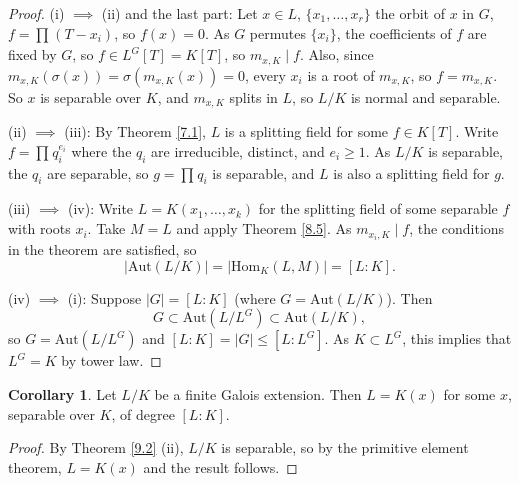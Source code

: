 \documentclass{article}
\theoremstyle{definition}
\newtheorem{cor}[theorem]{Corollary}
\begin{document}
\begin{proof}
    (i) $\implies $ (ii) and the last part: Let $x \in L$, $\{x_1,\ldots,x_r\}$ the orbit of $x$ in $G$, $f = \prod_{}^{} (T-x_i)$, so $f(x)=0$. As $G$ permutes $\{x_i\}$, the coefficients of $f$ are fixed by $G$, so $f \in L^G[T] = K[T]$, so $m_{x,K} \mid f$. Also, since $m_{x,K}(\sigma(x)) = \sigma(m_{x,K}(x))=0$, every $x_i$ is a root of $m_{x,K}$, so $f = m_{x,K}$. So $x$ is separable over $K$, and $m_{x,K}$ splits in $L$, so $L/K$ is normal and separable.
    \vspace{1mm}

    (ii) $\implies$ (iii): By Theorem \ref{7.1}, $L$ is a splitting field for some $f \in K[T]$. Write $f = \prod_{}^{} q_i^{e_i}$ where the $q_i$ are irreducible, distinct, and $e_i \ge 1$. As $L/K$ is separable, the $q_i$ are separable, so $g= \prod_{}^{} q_i$ is separable, and $L$ is also a splitting field for $g$.
    \vspace{1mm}

    (iii) $\implies$ (iv): Write $L=K(x_1,\ldots,x_k)$ for the splitting field of some separable $f$ with roots $x_i$. Take $M = L$ and apply Theorem \ref{8.5}. As $m_{x_i,K} \mid f$, the conditions in the theorem are satisfied, so $$|\text{Aut}(L/K)|=|\text{Hom}_K(L,M)|=[L : K].$$

    (iv) $\implies$ (i): Suppose $|G|=[L:K]$ (where $G = \text{Aut}(L/K)$). Then $$G \subset \text{Aut}(L/L^G) \subset \text{Aut}(L/K),$$ so $G = \text{Aut}(L/L^G)$ and $[L : K] = |G| \le [L : L^G]$. As $K \subset L^G$, this implies that $L^G = K$ by tower law.
\end{proof}
\begin{cor}\label{9.3}
    Let $L/K$ be a finite Galois extension. Then $L=K(x)$ for some $x$, separable over $K$, of degree $[L:K]$.
\end{cor}
\begin{proof}
    By Theorem \ref{9.2} (ii), $L/K$ is separable, so by the primitive element theorem, $L=K(x)$ and the result follows.
\end{proof}
\end{document}
